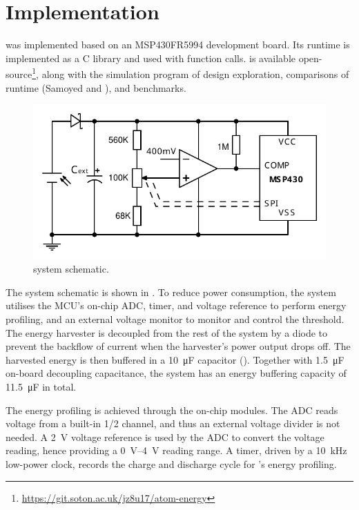 \section{Implementation} \label{sec:implementation}

\nn{} was implemented based on an MSP430FR5994 development board.
Its runtime is implemented as a C library and used with function calls. 
\nn{} is available open-source\footnote{\url{https://git.soton.ac.uk/jz8u17/atom-energy}}, along with the simulation program of design exploration, comparisons of runtime (Samoyed and \debs{}), and benchmarks.

\begin{figure}[!t]
    \centering
    \includegraphics[width=0.9\columnwidth]{ch5_optic/figures/circuit_v2.pdf}
    \caption{\nn{} system schematic. }
    \label{fig:schematic}
\end{figure}

The system schematic is shown in .
To reduce power consumption, the system utilises the MCU's on-chip ADC, timer, and voltage reference to perform energy profiling, and an external voltage monitor to monitor and control the threshold. 
The energy harvester is decoupled from the rest of the system by a diode to prevent the backflow of current when the harvester's power output drops off.
The harvested energy is then buffered in a \SI{10}{\micro\farad} capacitor (). 
Together with \SI{1.5}{\micro\farad} on-board decoupling capacitance, the system has an energy buffering capacity of \SI{11.5}{\micro\farad} in total. 


The energy profiling is achieved through the on-chip modules.
The ADC reads voltage from a built-in 1/2  channel, and thus an external voltage divider is not needed. 
A \SI{2}{\volt} voltage reference is used by the ADC to convert the voltage reading, hence providing a \SIrange{0}{4}{\volt} reading range. 
A timer, driven by a \SI{10}{\kilo\hertz} low-power clock, records the charge and discharge cycle for \nn{}'s energy profiling.

